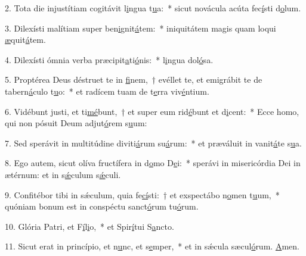 2. Tota die injustítiam cogitávit l\uline{i}ngua t\uline{u}a:~* sicut novácula acúta fec\uline{í}sti d\uline{o}lum.\par 
3. Dilexísti malítiam super ben\uline{i}gnit\uline{á}tem:~* iniquitátem magis quam loqui \uline{æ}quit\uline{á}tem.\par 
4. Dilexísti ómnia verba præcipit\uline{a}ti\uline{ó}nis:~* l\uline{i}ngua dol\uline{ó}sa.\par 
5. Proptérea Deus déstruet te in \uline{fi}nem,~† evéllet te, et emigrábit te de tabern\uline{á}culo t\uline{u}o:~* et radícem tuam de t\uline{e}rra viv\uline{é}ntium.\par 
6. Vidébunt justi, et ti\uline{mé}bunt,~† et super eum rid\uline{é}bunt et d\uline{i}cent:~* Ecce homo, qui non pósuit Deum adjut\uline{ó}rem s\uline{u}um:\par 
7. Sed sperávit in multitúdine diviti\uline{á}rum su\uline{á}rum:~* et præváluit in vanit\uline{á}te s\uline{u}a.\par 
8. Ego autem, sicut olíva fructífera in d\uline{o}mo D\uline{e}i:~* sperávi in misericórdia Dei in ætérnum: et in s\uline{ǽ}culum s\uline{ǽ}culi.\par 
9. Confitébor tibi in sǽculum, quia fe\uline{cí}sti:~† et exspectábo n\uline{o}men t\uline{u}um,~* quóniam bonum est in conspéctu sanct\uline{ó}rum tu\uline{ó}rum.\par 
10. Glória Patri, et F\uline{í}l\uline{i}o,~* et Spir\uline{í}tui S\uline{a}ncto.\par 
11. Sicut erat in princípio, et n\uline{u}nc, et s\uline{e}mper,~* et in sǽcula sæcul\uline{ó}rum. \uline{A}men.\par 

